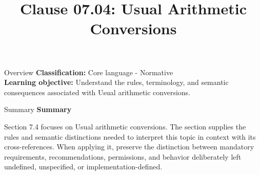 \documentclass[10pt,letterpaper]{article}
\title{Clause 07.04: Usual Arithmetic Conversions}
\author{}
\date{}
\begin{document}
\maketitle
\begin{CornellOverviewBox}{Overview}
\textbf{Classification:} Core language - Normative\\[2pt]
\textbf{Learning objective:} Understand the rules, terminology, and semantic consequences associated with Usual arithmetic conversions.
\end{CornellOverviewBox}\begin{CornellSummaryBox}{Summary}
{\sffamily\bfseries\color{Accent} Summary}\par\vspace{3pt}Section 7.4 focuses on Usual arithmetic conversions. The section supplies the rules and semantic distinctions needed to interpret this topic in context with its cross-references. When applying it, preserve the distinction between mandatory requirements, recommendations, permissions, and behavior deliberately left undefined, unspecified, or implementation-defined.
\end{CornellSummaryBox}
\end{document}
